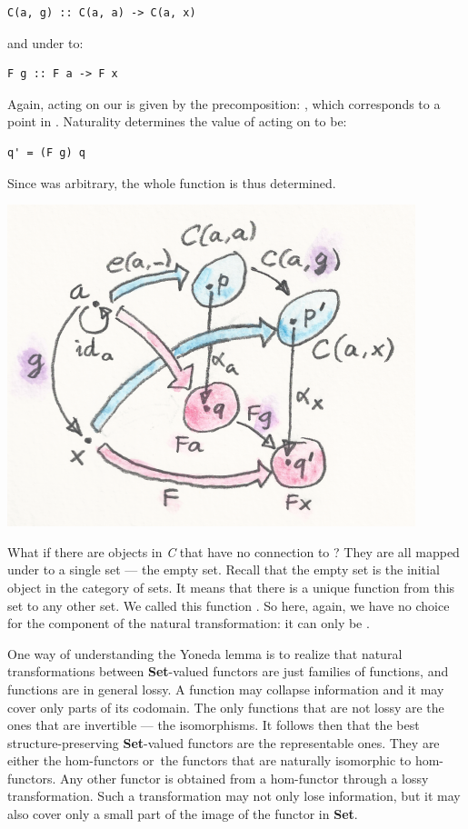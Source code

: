 \begin{verbatim}
C(a, g) :: C(a, a) -> C(a, x)
\end{verbatim}

and under  to:

\begin{verbatim}
F g :: F a -> F x
\end{verbatim}

Again,  acting on our  is given by the
precomposition: , which corresponds to a point
 in . Naturality determines the value
of  acting on  to be:

\begin{verbatim}
q' = (F g) q
\end{verbatim}

Since  was arbitrary, the whole function  is
thus determined.

\includegraphics{images/yoneda5.png}

What if there are objects in \emph{C} that have no connection to
? They are all mapped under  to a single set
--- the empty set. Recall that the empty set is the initial object in
the category of sets. It means that there is a unique function from this
set to any other set. We called this function . So here,
again, we have no choice for the component of the natural
transformation: it can only be .

One way of understanding the Yoneda lemma is to realize that natural
transformations between \textbf{Set}-valued functors are just families
of functions, and functions are in general lossy. A function may
collapse information and it may cover only parts of its codomain. The
only functions that are not lossy are the ones that are invertible ---
the isomorphisms. It follows then that the best structure-preserving
\textbf{Set}-valued functors are the representable ones. They are either
the hom-functors or~the functors that are naturally isomorphic to
hom-functors. Any other functor  is obtained from a
hom-functor through a lossy transformation. Such a transformation may
not only lose information, but it may also cover only a small part of
the image of the functor  in \textbf{Set}.

